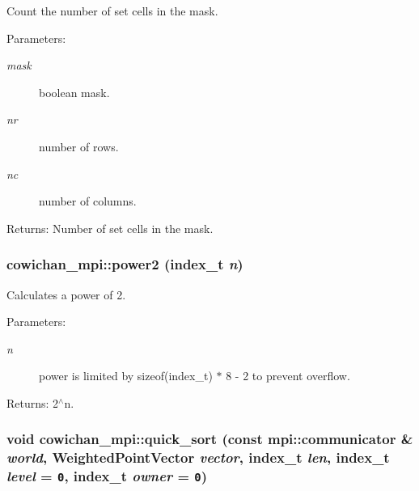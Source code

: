 Count the number of set cells in the mask. \begin{Desc}
\item[Parameters:]
\begin{description}
\item[{\em mask}]boolean mask. \item[{\em nr}]number of rows. \item[{\em nc}]number of columns. \end{description}
\end{Desc}
\begin{Desc}
\item[Returns:]Number of set cells in the mask. \end{Desc}
\hypertarget{namespacecowichan__mpi_a7c14e0bec9c9da1d56a348c9a0cf1f8}{
\subsubsection[{power2}]{ cowichan\_\-mpi::power2 ({\bf index\_\-t} {\em n})}}
\label{namespacecowichan__mpi_a7c14e0bec9c9da1d56a348c9a0cf1f8}


Calculates a power of 2. \begin{Desc}
\item[Parameters:]
\begin{description}
\item[{\em n}]power is limited by sizeof(index\_\-t) $\ast$ 8 - 2 to prevent overflow. \end{description}
\end{Desc}
\begin{Desc}
\item[Returns:]2$^\wedge$n. \end{Desc}
\hypertarget{namespacecowichan__mpi_4ab537d0df99e9011b206c7259e82d35}{
\subsubsection[{quick\_\-sort}]{\setlength{\rightskip}{0pt plus 5cm}void cowichan\_\-mpi::quick\_\-sort (const mpi::communicator \& {\em world}, \/  {\bf WeightedPointVector} {\em vector}, \/  {\bf index\_\-t} {\em len}, \/  {\bf index\_\-t} {\em level} = {\tt 0}, \/  {\bf index\_\-t} {\em owner} = {\tt 0})}}
\label{namespacecowichan__mpi_4ab537d0df99e9011b206c7259e82d35}



